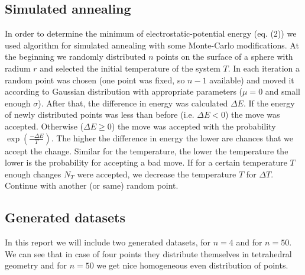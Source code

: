\documentclass[a4paper, 12pt]{article}
\begin{document}
\subsection{Simulated annealing}
In order to determine the minimum of electrostatic-potential energy (eq. (2)) we used algorithm for simulated annealing with some Monte-Carlo modifications. At the beginning we randomly distributed $n$ points on the surface of a sphere with radium $r$ and selected the initial temperature of the system $T$. In each iteration a random point was chosen (one point was fixed, so $n-1$ available) and moved it according to Gaussian distribution with appropriate parameters ($\mu = 0$ and small enough $\sigma$). After that, the difference in energy was calculated $\Delta E$. If the energy of newly distributed points was less than before (i.e. $\Delta E < 0$) the move was accepted. Otherwise ($\Delta E \geq 0$) the move was accepted with the probability $\exp(\frac{-\Delta E}{T})$. The higher the difference in energy the lower are chances that we accept the change. Similar for the temperature, the lower the temperature the lower is the probability for accepting a bad move. If for a certain temperature $T$ enough changes $N_T$ were accepted, we decrease the temperature $T$ for $\Delta T$. Continue with another (or same) random point.   

\subsection{Generated datasets}

In this report we will include two generated datasets, for $n = 4$ and for $n = 50$. We can see that in case of four points they distribute themselves in tetrahedral geometry and for $n = 50$ we get nice homogeneous even distribution of points.
\end{document}
